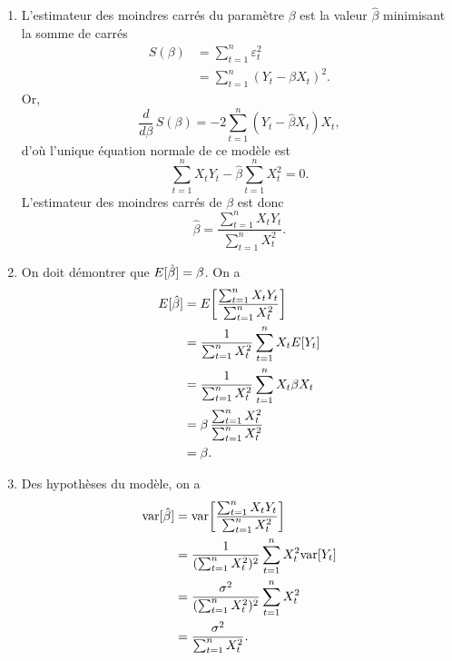 \begin{solution}{2.6}
    \begin{enumerate}
    \item L'estimateur des moindres carrés du paramètre $\beta$ est la
      valeur $\hat{\beta}$ minimisant la somme de carrés
      \begin{align*}
        S(\beta)
        &=\sum_{t = 1}^n \varepsilon_t^2 \\
        &=\sum_{t = 1}^n (Y_t - \beta X_t)^2.
      \end{align*}
      Or,
      \begin{displaymath}
        \frac{d}{d \beta}\, S(\beta) = -2 \sum_{t = 1}^n (Y_t -
        \hat{\beta} X_t) X_t,
      \end{displaymath}
      d'où l'unique équation normale de ce modèle est
      \begin{displaymath}
        \sum_{t = 1}^n X_t Y_t - \hat{\beta} \sum_{t=1}^n X_t^2 = 0.
      \end{displaymath}
      L'estimateur des moindres carrés de $\beta$ est donc
      \begin{displaymath}
        \hat{\beta} = \frac{\sum_{t=1}^n X_t Y_t}{\sum_{t=1}^n X_t^2}.
      \end{displaymath}
    \item On doit démontrer que $E [ \hat{\beta} ] = \beta$. On a
      \begin{align*}
        E [ \hat{\beta} ]
        &= E\! \left[ \frac{\sum_{t=1}^n X_t Y_t}{\sum_{t=1}^n X_t^2} \right] \\
        &= \frac{1}{\sum_{t=1}^n X_t^2} \sum_{t=1}^n X_t E [ Y_t ] \\
        &= \frac{1}{\sum_{t=1}^nX_t^2} \sum_{t=1}^n X_t \beta X_t \\
        &= \beta\, \frac{\sum_{t=1}^n X_t^2}{\sum_{t=1}^n X_t^2} \\
        &= \beta.
      \end{align*}
    \item Des hypothèses du modèle, on a
      \begin{align*}
        \mathrm{var} [ \hat{\beta} ]
        &= \mathrm{var}\! \left[ \frac{\sum_{t=1}^n X_t Y_t}{\sum_{t=1}^n X_t^2} \right] \\
        &= \frac{1}{(\sum_{t=1}^n X_t^2)^2} \sum_{t=1}^n X_t^2 \mathrm{var} [ Y_t ] \\
        &= \frac{\sigma^2}{(\sum_{t=1}^n X_t^2)^2} \sum_{t=1}^n X_t^2 \\
        &= \frac{\sigma^2}{\sum_{t=1}^n X_t^2}.
      \end{align*}
    \end{enumerate}
  
\end{solution}
